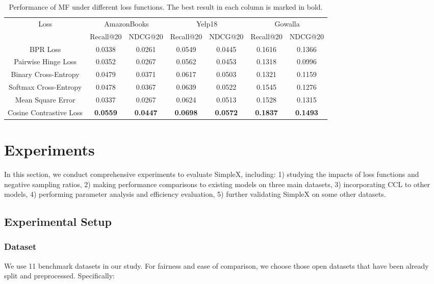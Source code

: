 \documentclass[sigconf,authorversion]{acmart}
\begin{document}
\begin{table*}[!t]
\centering
\caption{Performance of MF under different loss functions. The best result in each column is marked in bold.}
\begin{tabular}{c|cc|cc|cc}
\hline
\multirow{2}{*}{Loss} & \multicolumn{2}{c|}{AmazonBooks}  & \multicolumn{2}{c|}{Yelp18}       & \multicolumn{2}{c}{Gowalla}       \\ \cline{2-7} 
                    & Recall@20 & NDCG@20 & Recall@20 & NDCG@20 & Recall@20 & NDCG@20 \\ \hline\hline
BPR Loss             & 0.0338    & 0.0261  & 0.0549    & 0.0445  & 0.1616    & 0.1366  \\
Pairwise Hinge Loss   & 0.0352    & 0.0267  & 0.0562    & 0.0453  & 0.1318    & 0.0996  \\
Binary Cross-Entropy & 0.0479   & 0.0371  & 0.0617    & 0.0503  & 0.1321    & 0.1159  \\
Softmax Cross-Entropy & 0.0478    & 0.0367  & 0.0639    & 0.0522  & 0.1545    & 0.1276  \\
Mean Square Error     & 0.0337    & 0.0267  & 0.0624    & 0.0513  & 0.1528    & 0.1315  \\
Cosine Contrastive Loss   & \textbf{0.0559} & \textbf{0.0447} & \textbf{0.0698} & \textbf{0.0572} & \textbf{0.1837} & \textbf{0.1493} \\ \hline
\end{tabular}
\label{DifferentLoss}

\end{table*}


\section{Experiments}\label{sec:exp}



In this section, we conduct comprehensive experiments to evaluate SimpleX, including: 1) studying the impacts of loss functions and negative sampling ratios, 2) making performance comparisons to existing models on three main datasets, 3) incorporating CCL to other models, 4) performing parameter analysis and efficiency evaluation, 5) further validating SimpleX on some other datasets.
 
\subsection{Experimental Setup}
\subsubsection{Dataset}
\label{Dataset}
We use 11 benchmark datasets in our study. For fairness and ease of comparison, we choose those open datasets that have been already split and preprocessed. Specifically:
\end{document}
